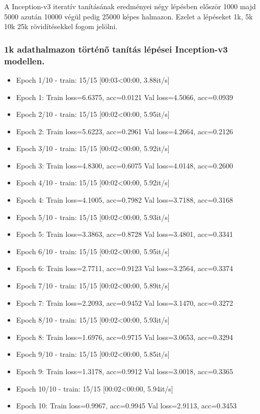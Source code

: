 A Inception-v3 iteratív tanításának eredményei négy lépésben először 1000 majd 5000 azután 10000 végül pedig 25000 képes halmazon. Ezelet a lépéseket 1k, 5k 10k 25k rövidítésekkel fogom jelölni.

\subsubsection{1k adathalmazon történő tanítás lépései Inception-v3 modellen.}
  \begin{itemize} 
    \item Epoch 1/10 - train: 15/15 [00:03<00:00, 3.88it/s]
    \item Epoch 1: Train loss=6.6375, acc=0.0121 Val loss=4.5066, acc=0.0939
    \item Epoch 2/10 - train: 15/15 [00:02<00:00, 5.95it/s]
    \item Epoch 2: Train loss=5.6223, acc=0.2961 Val loss=4.2664, acc=0.2126
    \item Epoch 3/10 - train: 15/15 [00:02<00:00, 5.92it/s]
    \item Epoch 3: Train loss=4.8300, acc=0.6075 Val loss=4.0148, acc=0.2600
    \item Epoch 4/10 - train: 15/15 [00:02<00:00, 5.92it/s]
    \item Epoch 4: Train loss=4.1005, acc=0.7982 Val loss=3.7188, acc=0.3168
    \item Epoch 5/10 - train: 15/15 [00:02<00:00, 5.93it/s]
    \item Epoch 5: Train loss=3.3863, acc=0.8728 Val loss=3.4801, acc=0.3341
    \item Epoch 6/10 - train: 15/15 [00:02<00:00, 5.95it/s]
    \item Epoch 6: Train loss=2.7711, acc=0.9123 Val loss=3.2564, acc=0.3374
    \item Epoch 7/10 - train: 15/15 [00:02<00:00, 5.89it/s]
    \item Epoch 7: Train loss=2.2093, acc=0.9452 Val loss=3.1470, acc=0.3272
    \item Epoch 8/10 - train: 15/15 [00:02<00:00, 5.93it/s]
    \item Epoch 8: Train loss=1.6976, acc=0.9715 Val loss=3.0653, acc=0.3294
    \item Epoch 9/10 - train: 15/15 [00:02<00:00, 5.85it/s]
    \item Epoch 9: Train loss=1.3178, acc=0.9912 Val loss=3.0018, acc=0.3365
    \item Epoch 10/10 - train: 15/15 [00:02<00:00, 5.94it/s]
    \item Epoch 10: Train loss=0.9967, acc=0.9945 Val loss=2.9113, acc=0.3453
  \end{itemize}

